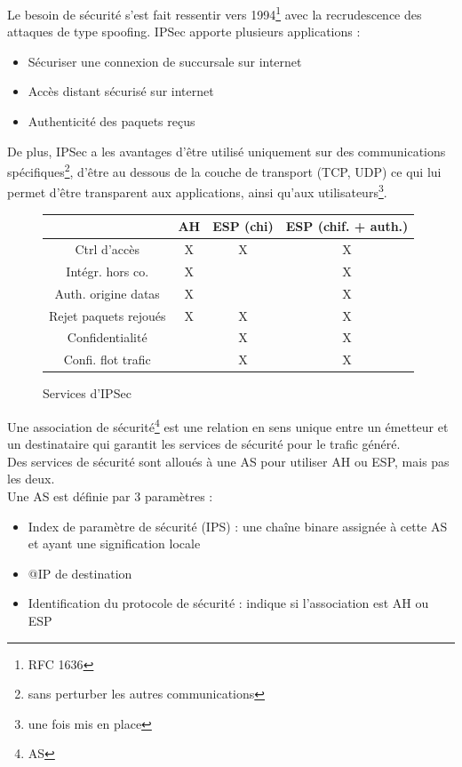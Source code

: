 \documentclass[journal, a4paper]{IEEEtran}
\begin{document}
	Le besoin de sécurité s'est fait ressentir vers 1994\footnote{RFC 1636} avec la recrudescence des attaques de type spoofing.
	IPSec apporte plusieurs applications :
	\begin{itemize}
		\item Sécuriser une connexion de succursale sur internet
		\item Accès distant sécurisé sur internet
		\item Authenticité des paquets reçus
	\end{itemize}
	De plus, IPSec a les avantages d'être utilisé uniquement sur des communications spécifiques\footnote{sans perturber les autres communications}, d'être au dessous de la couche de transport (TCP, UDP) ce qui lui permet d'être transparent aux applications, ainsi qu'aux utilisateurs\footnote{une fois mis en place}.
	\begin{figure}[hbt!]
			\begin{tabular}{c|ccc}
				~ & AH & ESP (chi) & ESP (chif. + auth.) \\
				\hline
				Ctrl d'accès & X & X & X \\
				Intégr. hors co. & X & & X \\
				Auth. origine datas & X & & X \\
				Rejet paquets rejoués & X & X & X \\
				Confidentialité & & X & X \\
				Confi. flot trafic & & X & X \\
			\end{tabular}
			\caption{Services d'IPSec}
			\label{fig:ipsec_services}
	\end{figure}
		
	Une association de sécurité\footnote{AS} est une relation en sens unique entre un émetteur et un destinataire qui garantit les services de sécurité pour le trafic généré.\\
	Des services de sécurité sont alloués à une AS pour utiliser AH ou ESP, mais pas les deux.\\
	Une AS est définie par 3 paramètres :
	\begin{itemize}
		\item Index de paramètre de sécurité (IPS) : une chaîne binare assignée à cette AS et ayant une signification locale
		\item @IP de destination
		\item Identification du protocole de sécurité : indique si l'association est AH ou ESP
	\end{itemize}
	
\end{document}
